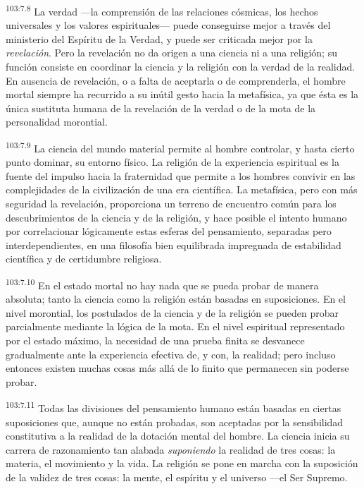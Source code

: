 \documentclass[twoside, 11pt]{book}
\begin{document}
\par
\textsuperscript{103:7.8} La verdad ---la comprensión de las relaciones cósmicas, los hechos universales y los valores espirituales--- puede conseguirse mejor a través del ministerio del Espíritu de la Verdad, y puede ser criticada mejor por la \textit{revelación}. Pero la revelación no da origen a una ciencia ni a una religión; su función consiste en coordinar la ciencia y la religión con la verdad de la realidad. En ausencia de revelación, o a falta de aceptarla o de comprenderla, el hombre mortal siempre ha recurrido a su inútil gesto hacia la metafísica, ya que ésta es la única sustituta humana de la revelación de la verdad o de la mota de la personalidad morontial.

\par
\textsuperscript{103:7.9} La ciencia del mundo material permite al hombre controlar, y hasta cierto punto dominar, su entorno físico. La religión de la experiencia espiritual es la fuente del impulso hacia la fraternidad que permite a los hombres convivir en las complejidades de la civilización de una era científica. La metafísica, pero con más seguridad la revelación, proporciona un terreno de encuentro común para los descubrimientos de la ciencia y de la religión, y hace posible el intento humano por correlacionar lógicamente estas esferas del pensamiento, separadas pero interdependientes, en una filosofía bien equilibrada impregnada de estabilidad científica y de certidumbre religiosa.

\par
\textsuperscript{103:7.10} En el estado mortal no hay nada que se pueda probar de manera absoluta; tanto la ciencia como la religión están basadas en suposiciones. En el nivel morontial, los postulados de la ciencia y de la religión se pueden probar parcialmente mediante la lógica de la mota. En el nivel espiritual representado por el estado máximo, la necesidad de una prueba finita se desvanece gradualmente ante la experiencia efectiva de, y con, la realidad; pero incluso entonces existen muchas cosas más allá de lo finito que permanecen sin poderse probar.

\par
\textsuperscript{103:7.11} Todas las divisiones del pensamiento humano están basadas en ciertas suposiciones que, aunque no están probadas, son aceptadas por la sensibilidad constitutiva a la realidad de la dotación mental del hombre. La ciencia inicia su carrera de razonamiento tan alabada \textit{suponiendo} la realidad de tres cosas: la materia, el movimiento y la vida. La religión se pone en marcha con la suposición de la validez de tres cosas: la mente, el espíritu y el universo ---el Ser Supremo.
\end{document}
